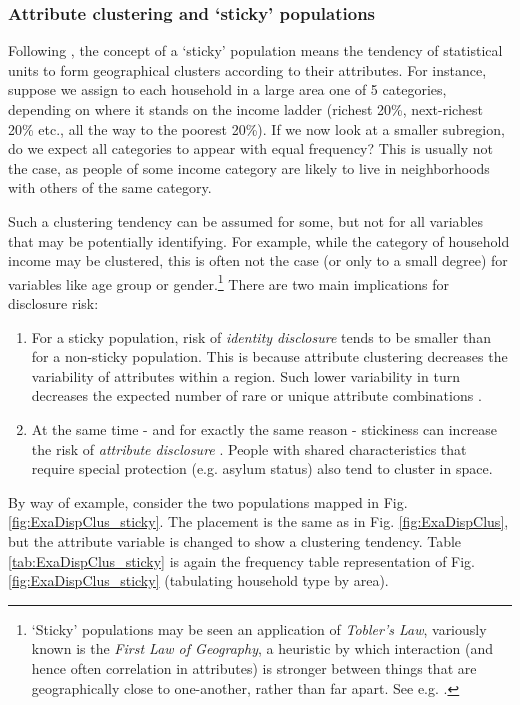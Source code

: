 \subsubsection{Attribute clustering and `sticky' populations}

Following \cite{ElliotEtAl1998}, the concept of a `sticky' population means the tendency of statistical units to form geographical clusters according to their attributes. For instance, suppose we assign to each household in a large area one of 5 categories, depending on where it stands on the income ladder (richest 20\%, next-richest 20\% etc., all the way to the poorest 20\%). If we now look at a smaller subregion, do we expect all categories to appear with equal frequency? This is usually not the case, as people of some income category are likely to live in neighborhoods with others of the same category.

Such a clustering tendency can be assumed for some, but not for all variables that may be potentially identifying. For example, while the category of household income may be clustered, this is often not the case (or only to a small degree) for variables like age group or gender.\footnote{
    `Sticky' populations may be seen an application of \emph{Tobler's Law}, variously known is the \emph{First Law of Geography}, a heuristic by which interaction (and hence often correlation in attributes) is stronger between things that are geographically close to one-another, rather than far apart. See e.g. \citet{Miller2004}.
}
There are two main implications for disclosure risk:
\begin{enumerate}
    \item For a sticky population, risk of \emph{identity disclosure} \cite[5.2]{HundepoolEtAl2024} tends to be smaller than for a non-sticky population. This is because attribute clustering decreases the variability of attributes within a region. Such lower variability in turn decreases the expected number of rare or unique attribute combinations \citep{GreenbergVoshell1990}. 
    \item At the same time - and for exactly the same reason - stickiness can increase the risk of \emph{attribute disclosure} \citep{BuronFontaine2018}. People with shared characteristics that require special protection (e.g. asylum status) also tend to cluster in space.
\end{enumerate}

By way of example, consider the two populations mapped in Fig. \ref{fig:ExaDispClus_sticky}. The placement is the same as in Fig. \ref{fig:ExaDispClus}, but the attribute variable is changed to show a clustering tendency. Table \ref{tab:ExaDispClus_sticky} is again the frequency table representation of Fig. \ref{fig:ExaDispClus_sticky} (tabulating household type by area).

